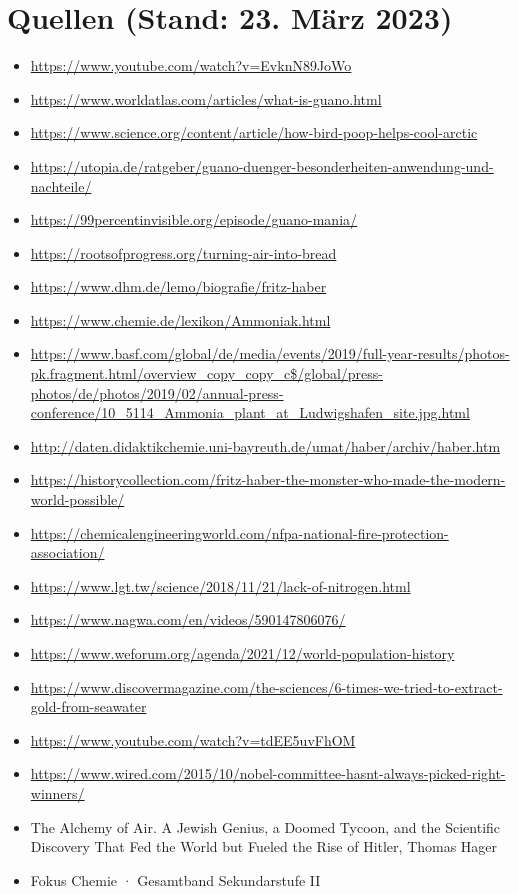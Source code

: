 \documentclass[11pt]{article}
\begin{document}
\newpage

\section*{Quellen (Stand: 23. März 2023)}

\small\begin{itemize}
            \item \url{https://www.youtube.com/watch?v=EvknN89JoWo}
            \item \url{https://www.worldatlas.com/articles/what-is-guano.html}
            \item \url{https://www.science.org/content/article/how-bird-poop-helps-cool-arctic}
            \item \url{https://utopia.de/ratgeber/guano-duenger-besonderheiten-anwendung-und-nachteile/} 
            \item \url{https://99percentinvisible.org/episode/guano-mania/}
            \item \url{https://rootsofprogress.org/turning-air-into-bread}
            \item \url{https://www.dhm.de/lemo/biografie/fritz-haber}
            \item \url{https://www.chemie.de/lexikon/Ammoniak.html}
            \item \url{https://www.basf.com/global/de/media/events/2019/full-year-results/photos-pk.fragment.html/overview_copy_copy_c$/global/press-photos/de/photos/2019/02/annual-press-conference/10_5114_Ammonia_plant_at_Ludwigshafen_site.jpg.html}
            \item \url{http://daten.didaktikchemie.uni-bayreuth.de/umat/haber/archiv/haber.htm}
            \item \url{https://historycollection.com/fritz-haber-the-monster-who-made-the-modern-world-possible/}
            \item \url{https://chemicalengineeringworld.com/nfpa-national-fire-protection-association/}
            \item \url{https://www.lgt.tw/science/2018/11/21/lack-of-nitrogen.html}
            \item \url{https://www.nagwa.com/en/videos/590147806076/}
            \item \url{https://www.weforum.org/agenda/2021/12/world-population-history}
            \item \url{https://www.discovermagazine.com/the-sciences/6-times-we-tried-to-extract-gold-from-seawater}
            \item \url{https://www.youtube.com/watch?v=tdEE5uvFhOM}
            \item \url{https://www.wired.com/2015/10/nobel-committee-hasnt-always-picked-right-winners/}
            \item The Alchemy of Air. A Jewish Genius, a Doomed Tycoon, and the Scientific Discovery That Fed the World but Fueled the Rise of Hitler, Thomas Hager
            \item Fokus Chemie · Gesamtband Sekundarstufe II
        \end{itemize}
\end{document}
